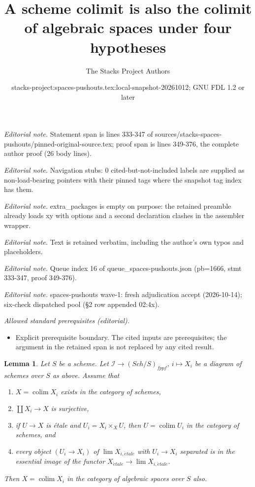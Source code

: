 \documentclass[10pt,a4paper]{amsart}
\title{A scheme colimit is also the colimit of algebraic spaces under four hypotheses}
\author{The Stacks Project Authors}
\date{stacks-project:spaces-pushouts.tex:local-snapshot-20261012; GNU FDL 1.2 or later}
\theoremstyle{plain}
\newtheorem{lemma}[subsection]{Lemma}
\theoremstyle{definition}
\theoremstyle{remark}
\numberwithin{equation}{subsection}
\def\lim{\mathop{\mathrm{lim}}\nolimits}
\def\colim{\mathop{\mathrm{colim}}\nolimits}
\def\Sch{\mathit{Sch}}
\def\etale{{\acute{e}tale}}
\begin{document}
\maketitle
\noindent\textit{Editorial note.} Statement span is lines 333-347 of sources/stacks-spaces-pushouts/pinned-original-source.tex; proof span is lines 349-376, the complete author proof (26 body lines).\par\medskip
\noindent\textit{Editorial note.} Navigation stubs: 0 cited-but-not-included labels are supplied as non-load-bearing pointers with their pinned tags where the snapshot tag index has them.\par\medskip
\noindent\textit{Editorial note.} extra\_packages is empty on purpose: the retained preamble already loads xy with options and a second declaration clashes in the assembler wrapper.\par\medskip
\noindent\textit{Editorial note.} Text is retained verbatim, including the author's own typos and placeholders.\par\medskip
\noindent\textit{Editorial note.} Queue index 16 of queue\_spaces-pushouts.json (pb=1666, stmt 333-347, proof 349-376).\par\medskip
\noindent\textit{Editorial note.} spaces-pushouts wave-1: fresh adjudication accept (2026-10-14); six-check dispatched pool (§2 row appended 02:4x).\par\medskip
\noindent\textit{Allowed standard prerequisites (editorial).}\begin{itemize}
\item Explicit prerequisite boundary. The cited inputs are prerequisites; the argument in the retained span is not replaced by any cited result.
\end{itemize}\medskip
\begin{lemma}
\label{lemma-colimit-agrees}
Let $S$ be a scheme. Let $\mathcal{I} \to (\Sch/S)_{fppf}$, $i \mapsto X_i$
be a diagram of schemes over $S$ as above. Assume that
\begin{enumerate}
\item $X = \colim X_i$ exists in the category of schemes,
\item $\coprod X_i \to X$ is surjective,
\item if $U \to X$ is \'etale and $U_i = X_i \times_X U$, then
$U = \colim U_i$ in the category of schemes, and
\item every object $(U_i \to X_i)$ of $\lim X_{i, \etale}$
with $U_i \to X_i$ separated is in the essential image of
the functor $X_\etale \to \lim X_{i, \etale}$.
\end{enumerate}
Then $X = \colim X_i$ in the category of algebraic spaces over $S$ also.
\end{lemma}
\end{document}

